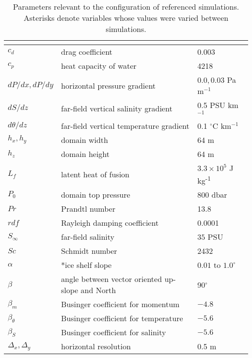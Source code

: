     \begin{table}[H]
    \caption{Parameters relevant to the configuration of referenced simulations. Asterisks denote variables whose values were varied between simulations.}
    \label{table:var}
    \begin{center}
    \begin{tabular}{lll}
    \multicolumn{3}{c}{}\\
	\hline
	$c_d$           & drag coefficient & 0.003 \\
    $c_p$       & heat capacity of water    & 4218\\   
	$dP/dx,dP/dy$   & horizontal pressure gradient & $0.0,0.03$ Pa m$^{-1}$\\
	$dS/dz$   & far-field vertical salinity gradient & 0.5 PSU km$^{-1}$\\
	$d\theta/dz$   & far-field vertical temperature gradient & 0.1 $^{\circ}$C km$^{-1}$\\
	$h_x,h_y$       & domain width              & 64 m\\
	$h_z$           & domain height             & 64 m\\ 
    $L_f$           & latent heat of fusion     & $3.3 \times 10^5$ J kg\textsuperscript{-1}\\
	$P_0$           & domain top pressure          & 800 dbar\\
	$Pr$           & Prandtl number      & 13.8\\
	$rdf$           & Rayleigh damping coefficient & 0.0001\\
	$S_{\infty}$      & far-field salinity     & $35$ PSU \\
	$Sc$           & Schmidt number      & 2432\\
	$\alpha$        & *ice shelf slope           &$0.01$ to $1.0^{\circ}$ \\
	$\beta$         & angle between vector oriented up-slope and North & 90$^{\circ}$\\
	$\beta_m$         & Businger coefficient for momentum & $-4.8$ \\
	$\beta_{\theta}$         & Businger coefficient for temperature & $-5.6$ \\
	$\beta_S$         & Businger coefficient for salinity & $-5.6$\\
	$\Delta_x,\Delta_y$& horizontal resolution  & 0.5 m\\

\end{tabular}
\end{center}
\end{table}
